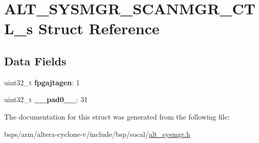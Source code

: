 \hypertarget{structALT__SYSMGR__SCANMGR__CTL__s}{}\section{A\+L\+T\+\_\+\+S\+Y\+S\+M\+G\+R\+\_\+\+S\+C\+A\+N\+M\+G\+R\+\_\+\+C\+T\+L\+\_\+s Struct Reference}
\label{structALT__SYSMGR__SCANMGR__CTL__s}
\subsection*{Data Fields}
\begin{DoxyCompactItemize}
\item 
\mbox{\label{structALT__SYSMGR__SCANMGR__CTL__s_a99d505c07e971401a9034c0d2855ab36}} 
uint32\+\_\+t {\bfseries fpgajtagen}\+: 1
\item 
\mbox{\label{structALT__SYSMGR__SCANMGR__CTL__s_aca0621ccfe76c5bd14724e6a88a04171}} 
uint32\+\_\+t {\bfseries \+\_\+\+\_\+pad0\+\_\+\+\_\+}\+: 31
\end{DoxyCompactItemize}


The documentation for this struct was generated from the following file\+:\begin{DoxyCompactItemize}
\item 
bsps/arm/altera-\/cyclone-\/v/include/bsp/socal/\mbox{\hyperlink{alt__sysmgr_8h}{alt\+\_\+sysmgr.\+h}}\end{DoxyCompactItemize}
